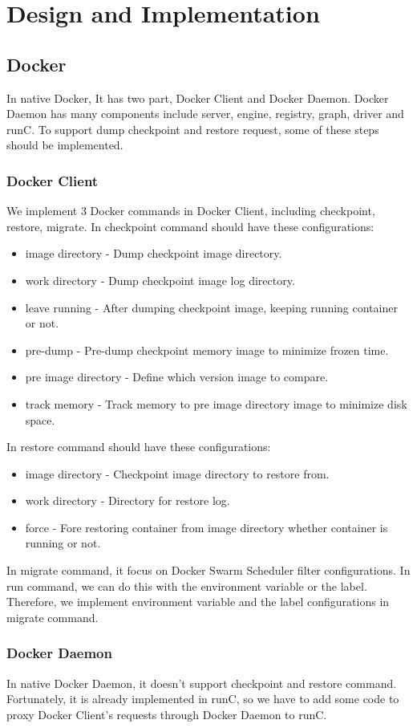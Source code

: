 \chapter{Design and Implementation}
\label{chap:design}
\section{Docker}
In native Docker, It has two part, Docker Client and Docker Daemon. Docker Daemon has many components include server, engine, registry, graph, driver and runC. To  support dump checkpoint and restore request, some of these steps should be implemented.

\subsection{Docker Client}
We implement 3 Docker commands in Docker Client, including checkpoint, restore, migrate. In checkpoint command should have these configurations:
\begin{itemize}
	\item image directory - Dump checkpoint image directory.
	\item work directory - Dump checkpoint image log directory.
	\item leave running - After dumping checkpoint image, keeping running container or not.
	\item pre-dump - Pre-dump checkpoint memory image to minimize frozen time.
	\item pre image directory - Define which version image to compare.
	\item track memory - Track memory to pre image directory image to minimize disk space.
\end{itemize}
In restore command should have these configurations:
\begin{itemize}
	\item image directory - Checkpoint image directory to restore from.
	\item work directory - Directory for restore log.
	\item force - Fore restoring container from image directory whether container is running or not.
\end{itemize}
In migrate command, it focus on Docker Swarm Scheduler filter configurations. In run command, we can do this with the environment variable or the label. Therefore, we implement environment variable and the label configurations in migrate command.

\subsection{Docker Daemon}
In native Docker Daemon, it doesn't support checkpoint and restore command.
Fortunately, it is already implemented in runC, so we have to add some code to proxy Docker Client's requests through Docker Daemon to runC.

